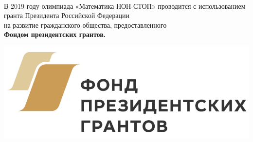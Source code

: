 \begin{frame}
	\ \\
	\noindent В 2019 году олимпиада «Математика НОН-СТОП» проводится
	с использованием гранта Президента Российской Федерации \\
	на развитие гражданского общества, предоставленного \\
	{\bfseries Фондом президентских грантов.}
	
	\vspace{0.45cm}
	\begin{center}
		\includegraphics[scale=0.6]{fpg}
	\end{center}
\end{frame}